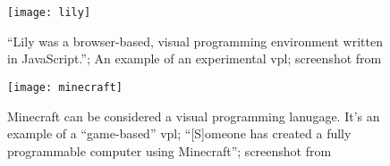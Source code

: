 \begin{figure}[h!]
    \centering \texttt{[image: lily]}
    \caption{
        ``Lily was a browser-based, visual programming environment written in JavaScript.''\protect\cite{lily_github};
        An example of an experimental \acrshort{vpl};
        screenshot from \protect\cite{fig_lily}
    }
    \label{fig:lily}
\end{figure}

\begin{figure}[h!]
    \centering \texttt{[image: minecraft]}
    \caption{
        Minecraft\cite{minecraft_site} can be considered a visual programming lanugage.
        It's an example of a ``game-based'' \acrshort{vpl};
        ``[S]omeone has created a fully programmable computer using Minecraft''\cite{snapshots};
        screenshot from \protect\cite{fig_minecraft}
    }
    \label{fig:minecraft}
\end{figure}
